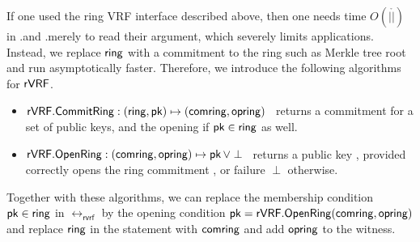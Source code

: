 


If one used the ring VRF interface described above, then one needs time
$O(|\ring|)$ in \rVRF.\rSign and \rVRF.\rVerify merely to read their \ring
argument, which severely limits applications.
Instead, we replace $ \mathsf{ring} $ with a commitment to the ring such as Merkle tree root and run asymptotically faster. Therefore, we introduce the following algorithms for $ {\mathsf{rVRF}} $.
\begin{itemize}
\item ${\mathsf{rVRF}}.{\mathsf{CommitRing}} : (\mathsf{ring},\mathsf{pk}) \mapsto (\mathsf{comring},\mathsf{opring})$ \,
    returns a commitment for a set \ring of public keys, and
     the opening \openring if $\mathsf{pk} \in \mathsf{ring}$ as well.
\item ${\mathsf{rVRF}}.{\mathsf{OpenRing}} : (\mathsf{comring},\mathsf{opring}) \mapsto \mathsf{pk} \, \lor \perp$ \,
    returns a public key \pk, provided \openring correctly opens
    the ring commitment \comring, or failure $\perp$ otherwise.
\end{itemize}

Together with these algorithms, we can replace the membership condition $\mathsf{pk} \in \mathsf{ring}$ in $  \rel_{\mathsf{rvrf}} $ by the opening condition
$ \mathsf{pk} = {\mathsf{rVRF}}.{\mathsf{OpenRing}}(\mathsf{comring},\mathsf{opring}) $ and replace $ \mathsf{ring} $ in the statement with $ \mathsf{comring} $ and add $ \mathsf{opring} $ to the witness.





